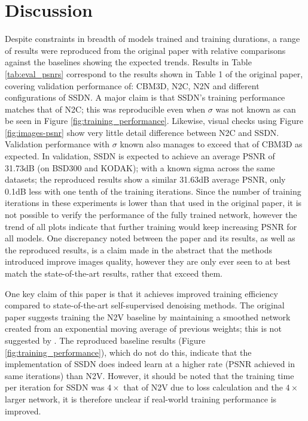 \documentclass{article} %
\begin{document}
\section{Discussion}
Despite constraints in breadth of models trained and training durations, a range of results were reproduced from the original paper with relative comparisons against the baselines showing the expected trends. Results in Table \ref{tab:eval_psnrs} correspond to the results shown in Table 1 of the original paper, covering validation performance of: CBM3D, N2C, N2N and different configurations of SSDN. A major claim is that SSDN's training performance matches that of N2C; this was reproducible even when $\sigma$ was not known as can be seen in Figure \ref{fig:training_performance}. Likewise, visual checks using Figure \ref{fig:images-psnr} show very little detail difference between N2C and SSDN. Validation performance with $\sigma$ known also manages to exceed that of CBM3D as expected. In validation, SSDN is expected to achieve an average PSNR of 31.73dB (on BSD300 and KODAK); with a known sigma across the same datasets; the reproduced results show a similar 31.63dB average PSNR, only 0.1dB less with one tenth of the training iterations. Since the number of training iterations in these experiments is lower than that used in the original paper, it is not possible to verify the performance of the fully trained network, however the trend of all plots indicate that further training would keep increasing PSNR for all models. One discrepancy noted between the paper and its results, as well as the reproduced results, is a claim made in the abstract that the methods introduced improve images quality, however they are only ever seen to at best match the state-of-the-art results, rather that exceed them.

One key claim of this paper is that it achieves improved training efficiency compared to state-of-the-art self-supervised denoising methods. The original paper suggests training the N2V baseline by maintaining a smoothed network created from an exponential moving average of previous weights; this is not suggested by \cite{noise2void}. The reproduced baseline results (Figure \ref{fig:training_performance}), which do not do this, indicate that the implementation of SSDN does indeed learn at a higher rate (PSNR achieved in same iterations) than N2V. However, it should be noted that the training time per iteration for SSDN was $4\times$ that of N2V due to loss calculation and the $4\times$ larger network, it is therefore unclear if real-world training performance is improved. 
\end{document}
